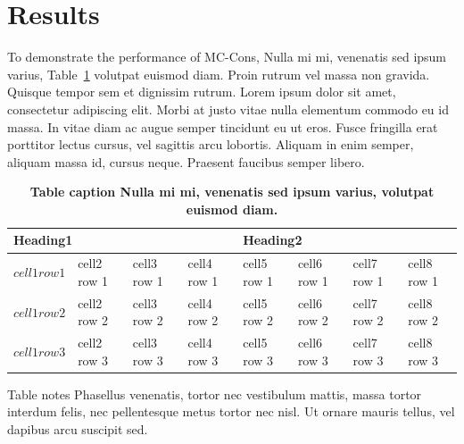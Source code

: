 \documentclass[10pt,letterpaper]{article}
\begin{document}

\newpage
\section*{Results}

To demonstrate the performance of MC-Cons, 
Nulla mi mi, venenatis sed ipsum varius, Table~\ref{table1} volutpat euismod diam. Proin rutrum vel massa non gravida. Quisque tempor sem et dignissim rutrum. Lorem ipsum dolor sit amet, consectetur adipiscing elit. Morbi at justo vitae nulla elementum commodo eu id massa. In vitae diam ac augue semper tincidunt eu ut eros. Fusce fringilla erat porttitor lectus cursus, vel sagittis arcu lobortis. Aliquam in enim semper, aliquam massa id, cursus neque. Praesent faucibus semper libero.


\begin{table}[!ht]
\begin{adjustwidth}{-2.25in}{0in} %
\caption{
{\bf Table caption Nulla mi mi, venenatis sed ipsum varius, volutpat euismod diam.}}
\begin{tabular}{|l|l|l|l|l|l|l|l|}
\hline
\multicolumn{4}{|l|}{\bf Heading1} & \multicolumn{4}{|l|}{\bf Heading2}\\ \hline
$cell1 row1$ & cell2 row 1 & cell3 row 1 & cell4 row 1 & cell5 row 1 & cell6 row 1 & cell7 row 1 & cell8 row 1\\ \hline
$cell1 row2$ & cell2 row 2 & cell3 row 2 & cell4 row 2 & cell5 row 2 & cell6 row 2 & cell7 row 2 & cell8 row 2\\ \hline
$cell1 row3$ & cell2 row 3 & cell3 row 3 & cell4 row 3 & cell5 row 3 & cell6 row 3 & cell7 row 3 & cell8 row 3\\ \hline
\end{tabular}
\begin{flushleft} Table notes Phasellus venenatis, tortor nec vestibulum mattis, massa tortor interdum felis, nec pellentesque metus tortor nec nisl. Ut ornare mauris tellus, vel dapibus arcu suscipit sed.
\end{flushleft}
\label{table1}
\end{adjustwidth}
\end{table}
\end{document}
